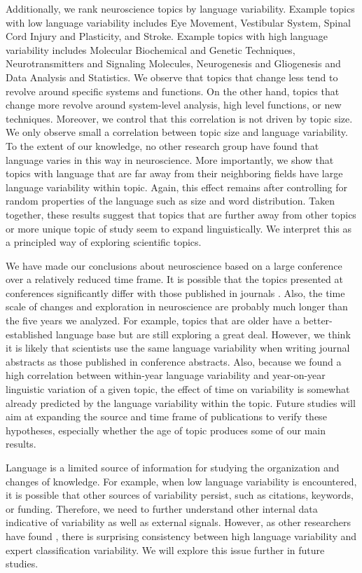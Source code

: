 \documentclass[10pt,letterpaper]{article}
\begin{document}
Additionally, we rank neuroscience topics by language variability. Example topics with low language variability includes Eye Movement, Vestibular System, Spinal Cord Injury and Plasticity, and Stroke. Example topics with high language variability includes Molecular Biochemical and Genetic Techniques, Neurotransmitters and Signaling Molecules, Neurogenesis and Gliogenesis and Data Analysis and Statistics. We observe that topics that change less tend to revolve around specific systems and functions. On the other hand, topics that change more revolve around system-level analysis, high level functions, or new techniques. Moreover, we control that this correlation is not driven by topic size. We only observe small a correlation between topic size and language variability. To the extent of our knowledge, no other research group have found that language varies in this way in neuroscience. More importantly, we show that topics with language that are far away from their neighboring fields have large language variability within topic. Again, this effect remains after controlling for random properties of the language such as size and word distribution. Taken together, these results suggest that topics that are further away from other topics or more unique topic of study seem to expand linguistically. We interpret this as a principled way of exploring scientific topics.

We have made our conclusions about neuroscience based on a large conference over a relatively reduced time frame. It is possible that the topics presented at conferences significantly differ with those published in journals \cite{yeung2017changing}. Also, the time scale of changes and exploration in neuroscience are probably much longer than the five years we analyzed. For example, topics that are older have a better-established language base but are still exploring a great deal. However, we think it is likely that scientists use the same language variability when writing journal abstracts as those published in conference abstracts. Also, because we found a high correlation between within-year language variability and year-on-year linguistic variation of a given topic, the effect of time on variability is somewhat already predicted by the language variability within the topic. Future studies will aim at expanding the source and time frame of publications to verify these hypotheses, especially whether the age of topic produces some of our main results.


Language is a limited source of information for studying the organization and changes of knowledge. For example, when low language variability is encountered, it is possible that other sources of variability persist, such as citations, keywords, or funding. Therefore, we need to further understand other internal data indicative of variability as well as external signals. However, as other researchers have found \cite{dias2017using}, there is surprising consistency between high language variability and expert classification variability. We will explore this issue further in future studies.
\end{document}
